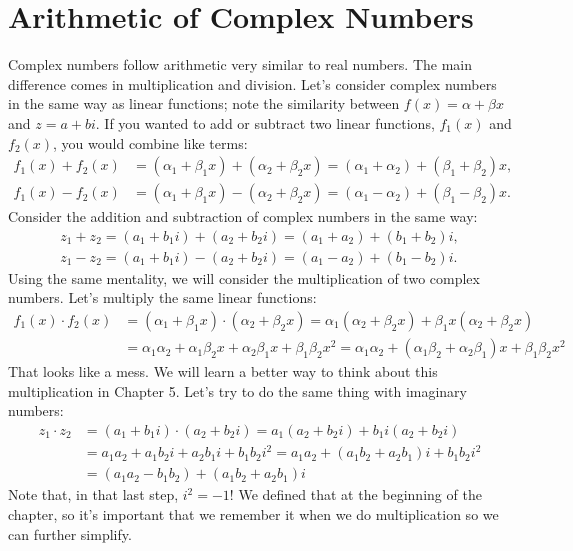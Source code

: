 \documentclass[../book.tex]{subfiles}
\begin{document}
\section{Arithmetic of Complex Numbers}
Complex numbers follow arithmetic very similar to real numbers.  The main difference comes in multiplication and division.  Let's consider complex numbers in the same way as linear functions; note the similarity between $f(x)=\alpha+\beta x$ and $z=a+bi$.  If you wanted to add or subtract two linear functions, $f_1(x)$ and $f_2(x)$, you would combine like terms: \begin{align*}
    f_1(x)+f_2(x)&=\left(\alpha_1+\beta_1 x\right)+\left(\alpha_2+\beta_2 x\right)=\left(\alpha_1+\alpha_2\right)+\left(\beta_1+\beta_2 \right)x, \\
    f_1(x)-f_2(x)&=\left(\alpha_1+\beta_1 x\right)-\left(\alpha_2+\beta_2 x\right)=\left(\alpha_1-\alpha_2\right)+\left(\beta_1-\beta_2 \right)x.
\end{align*}
Consider the addition and subtraction of complex numbers in the same way:
\begin{align*}
    z_1+z_2=\left(a_1+b_1i\right)+\left(a_2+b_2i\right)=\left(a_1+a_2\right)+\left(b_1+b_2\right)i, \\ 
    z_1-z_2=\left(a_1+b_1i\right)-\left(a_2+b_2i\right)=\left(a_1-a_2\right)+\left(b_1-b_2\right)i.
\end{align*}
Using the same mentality, we will consider the multiplication of two complex numbers.  Let's multiply the same linear functions: \begin{align*}
    f_1(x)\cdot f_2(x)&=\left(\alpha_1+\beta_1 x\right)\cdot \left(\alpha_2+\beta_2 x\right)=\alpha_1\left(\alpha_2+\beta_2 x\right)+\beta_1 x\left(\alpha_2+\beta_2 x\right) \\
    &= \alpha_1\alpha_2+\alpha_1\beta_2 x+\alpha_2\beta_1x+\beta_1\beta_2x^2=\alpha_1\alpha_2+\left(\alpha_1\beta_2+\alpha_2\beta_1\right)x+\beta_1\beta_2x^2
\end{align*}
That looks like a mess.  We will learn a better way to think about this multiplication in Chapter 5.  Let's try to do the same thing with imaginary numbers:\begin{align*}
    z_1\cdot z_2&=\left(a_1+b_1i\right)\cdot \left(a_2+b_2i\right)=a_1\left(a_2+b_2i\right)+b_1i\left(a_2+b_2i\right) \\
    &=a_1a_2+a_1b_2i+a_2b_1i+b_1b_2i^2=a_1a_2+\left(a_1b_2+a_2b_1\right)i+b_1b_2i^2 \\
    &=\left(a_1a_2-b_1b_2\right)+\left(a_1b_2+a_2b_1\right)i
\end{align*}
Note that, in that last step, $i^2=-1$!  We defined that at the beginning of the chapter, so it's important that we remember it when we do multiplication so we can further simplify.  
\end{document}
